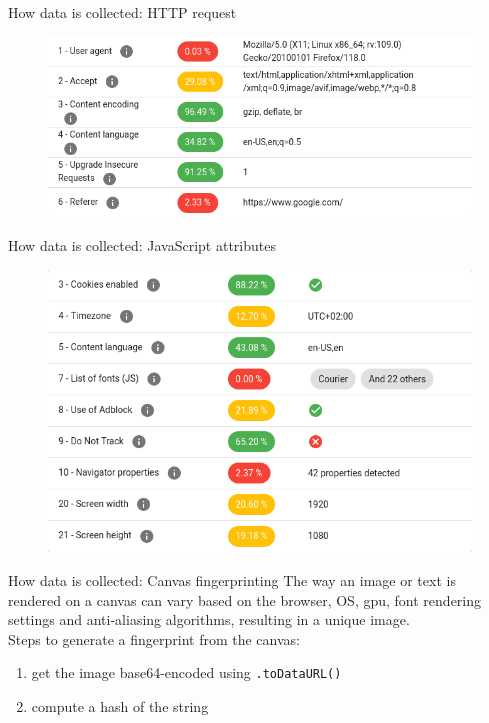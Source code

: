 \begin{frame}{How data is collected: HTTP request}
  \begin{figure}
    \centering
    \includegraphics[width=\textwidth]{images/http-data.png}
  \end{figure}
\end{frame}

\begin{frame}{How data is collected: JavaScript attributes}
  \begin{figure}
    \centering
    \includegraphics[width=\textwidth]{images/js-data.png}
  \end{figure}
\end{frame}

\begin{frame}{How data is collected: Canvas fingerprinting}
  The way an image or text is rendered on a canvas can vary based on the browser, OS, gpu, font rendering settings and anti-aliasing algorithms, resulting in a unique image.\\

  Steps to generate a fingerprint from the canvas:
  \begin{enumerate}
    \item get the image base64-encoded using \texttt{.toDataURL()}
    \item compute a hash of the string
  \end{enumerate}
\end{frame}

